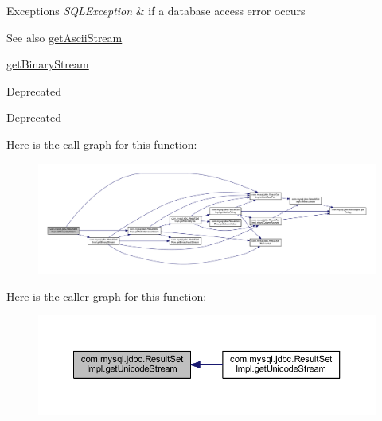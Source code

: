 \begin{DoxyExceptions}{Exceptions}
{\em S\+Q\+L\+Exception} & if a database access error occurs\\
\hline
\end{DoxyExceptions}
\begin{DoxySeeAlso}{See also}
\mbox{\hyperlink{classcom_1_1mysql_1_1jdbc_1_1_result_set_impl_a3121b8b483b8b8bfcdf6b1b977a60808}{get\+Ascii\+Stream}} 

\mbox{\hyperlink{classcom_1_1mysql_1_1jdbc_1_1_result_set_impl_a59faa6b2172c9dafdc26ea397bc4fc93}{get\+Binary\+Stream}} 
\end{DoxySeeAlso}
\begin{DoxyRefDesc}{Deprecated}
\item[\mbox{\hyperlink{deprecated__deprecated000020}{Deprecated}}]\end{DoxyRefDesc}
Here is the call graph for this function\+:
\nopagebreak
\begin{figure}[H]
\begin{center}
\leavevmode
\includegraphics[width=350pt]{classcom_1_1mysql_1_1jdbc_1_1_result_set_impl_ae1fb89a978f6a70882bb7305f8266234_cgraph}
\end{center}
\end{figure}
Here is the caller graph for this function\+:
\nopagebreak
\begin{figure}[H]
\begin{center}
\leavevmode
\includegraphics[width=350pt]{classcom_1_1mysql_1_1jdbc_1_1_result_set_impl_ae1fb89a978f6a70882bb7305f8266234_icgraph}
\end{center}
\end{figure}
\mbox{\label{classcom_1_1mysql_1_1jdbc_1_1_result_set_impl_ac6f678af8cdf491781c04615014e58f5}} 
